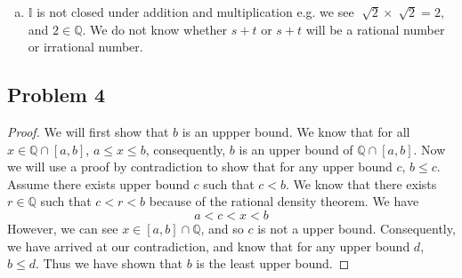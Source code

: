 \documentclass[12pt]{article}
\begin{document}
\begin{enumerate}[a).]
{        \begin{proof}
            We will use contradiction to show that if $a \in \mathbb{Q}$ and $t \in \mathbb{I}$, then $at \in \mathbb{I}$. 
            Assume not, that is, $a \in \mathbb{Q}$, $t \in \mathbb{I}$, and $at \in \mathbb{Q}$. 
            Because $at \in \mathbb{Q}$, $at = \frac{p}{q}$ for $p,q \in \mathbb{Z}$ and $q \ne 0$. 
            In addition, because $a \in \mathbb{Q}$, $a = \frac{c}{d}$ for $c, d \in \mathbb{Z}$ and $d \ne 0$. 
            We see 
            \begin{align*}
                at &= at\\
                \frac{c}{d}t &= \frac{p}{q}\\
                t &= \frac{pc}{qd}\\
            \end{align*}
            Because $pc, pd \in \mathbb{Z}$ and $pd \ne 0$, we know that $t \in \mathbb{Q}$.
            Thus we have arrived at our contradiction because we know that $t \in \mathbb{R}$. 
        \end{proof}
    }
    \item {
        $\mathbb{I}$ is not closed under addition and multiplication
        e.g. we see $\sqrt[]{2} \times \sqrt[]{2} = 2$, and $2 \in \mathbb{Q}$. 
        We do not know whether $s+t$ or $s+t$ will be a rational number or irrational number. 
    }
\end{enumerate}

\subsection*{Problem 4}
\begin{proof}
    We will first show that $b$ is an uppper bound.
    We know that for all $x \in \mathbb{Q} \cap [a,b]$, $a \le x \le b$, consequently, $b$ is an upper bound of $\mathbb{Q} \cap [a,b]$. 
    Now we will use a proof by contradiction to show that for any upper bound $c$, $b \le c$. 
    Assume there exists upper bound $c$ such that $c < b$. 
    We know that there exists $r \in \mathbb{Q}$ such that $c < r < b$ because of the rational density theorem. 
    We have $$a < c < x < b$$
    However, we can see $x \in [a,b] \cap \mathbb{Q}$, and so $c$ is not a upper bound. 
    Consequently, we have arrived at our contradiction, and know that for any upper bound $d$, $b\le d$. 
    Thus we have shown that $b$ is the least upper bound.
    
\end{proof}
\end{document}

